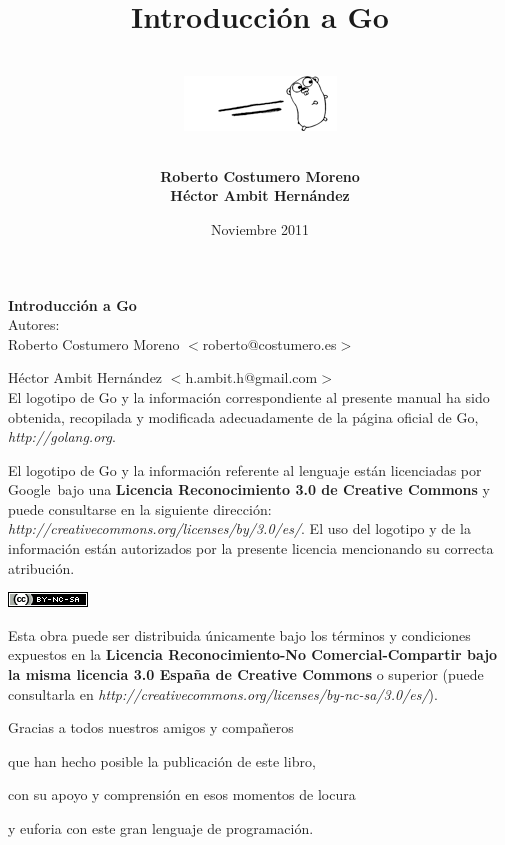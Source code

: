 \documentclass[a4paper,titlepage,twoside,openright]{book}
\begin{document}
\title{
	{\Huge Introducción a Go}\\
	\ \\
	\includegraphics{images/go_logo.png}
	\author{\textbf{Roberto Costumero Moreno}\\
	\textbf{Héctor Ambit Hernández}
	}
}
\date{Noviembre 2011}
\maketitle
\newpage

\thispagestyle{empty}
\textbf{\Large{Introducción a Go}}\\

Autores:\\

Roberto Costumero Moreno $<$roberto@costumero.es$>$

Héctor Ambit Hernández $<$h.ambit.h@gmail.com$>$\\

El logotipo de Go y la información correspondiente al presente manual ha sido obtenida, recopilada y modificada adecuadamente de la página oficial de Go, \textit{http://golang.org}.

El logotipo de Go y la información referente al lenguaje están licenciadas por Google\texttrademark\  bajo una \textbf{Licencia Reconocimiento 3.0 de Creative Commons} y puede consultarse en la siguiente dirección: \textit{http://creativecommons.org/licenses/by/3.0/es/}. El uso del logotipo y de la información están autorizados por la presente licencia mencionando su correcta atribución.

\begin{flushleft}
\includegraphics{images/cc.png}
\end{flushleft}

Esta obra puede ser distribuida únicamente bajo los términos y condiciones expuestos en la \textbf{Licencia Reconocimiento-No Comercial-Compartir bajo la misma licencia 3.0 España de Creative Commons} o superior (puede consultarla en \textit{http://creativecommons.org/licenses/by-nc-sa/3.0/es/}).\\

\clearpage
\thispagestyle{empty}
\begin{flushright}
Gracias a todos nuestros amigos y compañeros

que han hecho posible la publicación de este libro,

con su apoyo y comprensión en esos momentos de locura

y euforia con este gran lenguaje de programación.
\end{flushright}
\clearpage
\end{document}

